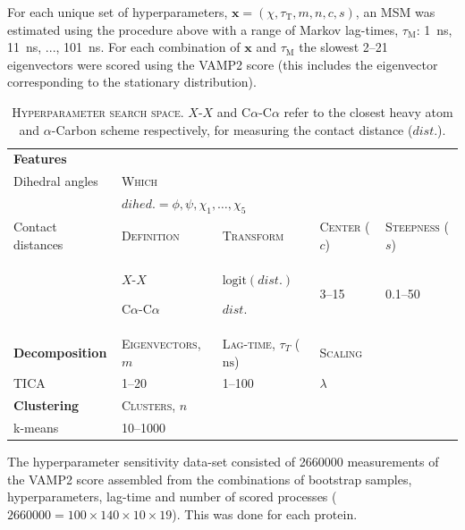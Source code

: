 \documentclass[journal=jacsat,manuscript=article]{achemso}
\newcommand{\nextitem}{\par\hspace*{\labelsep}\textbullet\hspace*{\labelsep}}
\begin{document}
For each unique set of hyperparameters, $\mathbf{x} = (\chi, \tau_{\mathrm{T}}, m, n, c, s)$,  an MSM was estimated using the procedure above with a range of Markov lag-times, $\tau_{\mathrm{M}}$: \SI{1}{\nano\second}, \SI{11}{\nano\second}, ..., \SI{101}{\nano\second}. For each combination of $\mathbf{x}$ and  $\tau_{\mathrm{M}}$ the slowest \numrange{2}{21} eigenvectors were scored using the VAMP2 score (this includes the eigenvector corresponding to the stationary distribution). 
\begin{table}
    \centering
    \begin{tabularx}{\textwidth}{lXXXX}
    \toprule
    \textbf{Features}  & & & &\\
    Dihedral angles & \textsc{Which} & & &\\
    & \multicolumn{2}{l}{$dihed.=\phi, \psi, \chi_{1}, \ldots, \chi_{5}$ } & & \\
    Contact distances &  \textsc{Definition} & \textsc{Transform}& \textsc{Center} ($c$) & \textsc{Steepness} ($s$) \\

     & \nextitem $X$-$X$  \nextitem C$\alpha$-C$\alpha$ & \nextitem $\mathrm{logit}(dist.)$ \nextitem $dist.$ &  \numrange{3}{15} & \numrange{0.1}{50} \\
    \midrule
    \textbf{Decomposition} & \textsc{Eigenvectors}, $m$ & \textsc{Lag-time}, $\tau_{T}$ ($\si{\nano\second}$) & \textsc{Scaling}\\ 
    TICA & \numrange{1}{20} & \numrange{1}{100} & $\lambda$\\
    \midrule
    \textbf{Clustering} & \textsc{Clusters}, $n$ &\\
    k-means & \numrange{10}{1000} & \\
    \bottomrule
    \end{tabularx}
    \caption{\textsc{Hyperparameter search space}. $X$-$X$ and C$\alpha$-C$\alpha$  refer to the closest heavy atom and $\alpha$-Carbon scheme respectively, for measuring the contact distance ($dist.$).  }
    \label{tab:search_space}
\end{table}

The hyperparameter sensitivity data-set consisted of \num{2660000} measurements of the VAMP2 score assembled from the combinations of bootstrap samples, hyperparameters, lag-time and number of scored processes  ($\num{2660000}=100 \times 140 \times 10 \times 19$). This was done for each protein. 
\end{document}
